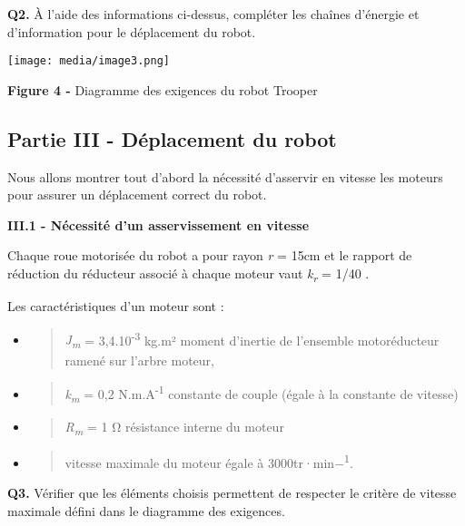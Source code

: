 \documentclass[
]{article}
\begin{document}
\textbf{Q2.} À l'aide des informations ci-dessus, compléter les chaînes
d'énergie et d'information pour le déplacement du robot.

\texttt{[image: media/image3.png]}

\textbf{Figure 4 -} Diagramme des exigences du robot Trooper

\hypertarget{partie-iii---duxe9placement-du-robot}{%
\subsection{Partie III - Déplacement du
robot}\label{partie-iii---duxe9placement-du-robot}}

Nous allons montrer tout d'abord la nécessité d'asservir en vitesse les
moteurs pour assurer un déplacement correct du robot.

\textbf{III.1 - Nécessité d'un asservissement en vitesse}

Chaque roue motorisée du robot a pour rayon \emph{r} = 15cm et le
rapport de réduction du réducteur associé à chaque moteur vaut
\emph{k\textsubscript{r }}= 1/40 .

Les caractéristiques d'un moteur sont :

\begin{itemize}
\item
  \begin{quote}
  \emph{J\textsubscript{m}} = 3,4.10\textsuperscript{-3} kg.m² moment
  d'inertie de l'ensemble motoréducteur ramené sur l'arbre moteur,
  \end{quote}
\item
  \begin{quote}
  \emph{k\textsubscript{m}} = 0,2 N.m.A\textsuperscript{-1} constante de
  couple (égale à la constante de vitesse)
  \end{quote}
\item
  \begin{quote}
  \emph{R\textsubscript{m}} = 1 Ω résistance interne du moteur
  \end{quote}
\item
  \begin{quote}
  vitesse maximale du moteur égale à 3000tr·min−\textsuperscript{1}.
  \end{quote}
\end{itemize}

\textbf{Q3.} Vérifier que les éléments choisis permettent de respecter
le critère de vitesse maximale défini dans le diagramme des exigences.
\end{document}
